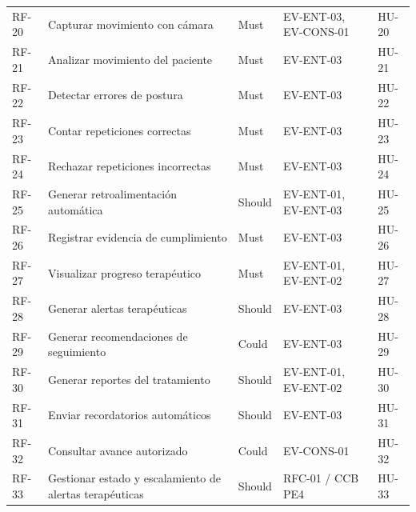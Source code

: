 \documentclass[12pt,a4paper]{article}
\begin{document}
\begin{longtable}{p{}p{}p{}p{}p{}}
RF-20 & Capturar movimiento con cámara & Must & EV-ENT-03, EV-CONS-01 & HU-20 \\
RF-21 & Analizar movimiento del paciente & Must & EV-ENT-03 & HU-21 \\
RF-22 & Detectar errores de postura & Must & EV-ENT-03 & HU-22 \\
RF-23 & Contar repeticiones correctas & Must & EV-ENT-03 & HU-23 \\
RF-24 & Rechazar repeticiones incorrectas & Must & EV-ENT-03 & HU-24 \\
RF-25 & Generar retroalimentación automática & Should & EV-ENT-01, EV-ENT-03 & HU-25 \\
RF-26 & Registrar evidencia de cumplimiento & Must & EV-ENT-03 & HU-26 \\
RF-27 & Visualizar progreso terapéutico & Must & EV-ENT-01, EV-ENT-02 & HU-27 \\
RF-28 & Generar alertas terapéuticas & Should & EV-ENT-03 & HU-28 \\
RF-29 & Generar recomendaciones de seguimiento & Could & EV-ENT-03 & HU-29 \\
RF-30 & Generar reportes del tratamiento & Should & EV-ENT-01, EV-ENT-02 & HU-30 \\
RF-31 & Enviar recordatorios automáticos & Should & EV-ENT-03 & HU-31 \\
RF-32 & Consultar avance autorizado & Could & EV-CONS-01 & HU-32 \\
RF-33 & Gestionar estado y escalamiento de alertas terapéuticas & Should & RFC-01 / CCB PE4 & HU-33 \\
\bottomrule\end{longtable}\normalsize
\end{document}

